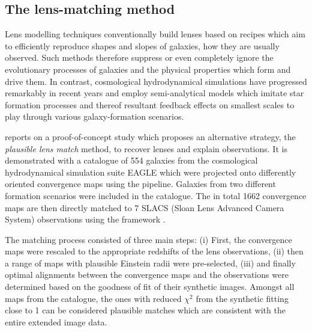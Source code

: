 \subsection{The lens-matching method}

Lens modelling techniques conventionally build lenses based on recipes which aim
to efficiently reproduce shapes and slopes of galaxies, how they are usually
observed.  Such methods therefore suppress or even completely ignore the
evolutionary processes of galaxies and the physical properties which form and
drive them.  In contrast, cosmological hydrodynamical simulations have
progressed remarkably in recent years and employ semi-analytical models which
imitate star formation processes and thereof resultant feedback effects on
smallest scales to play through various galaxy-formation scenarios.

 reports on a proof-of-concept study which proposes an alternative
strategy, the \textit{plausible lens match} method, to recover lenses and
explain observations.  It is demonstrated with a catalogue of 554 galaxies from
the cosmological hydrodynamical simulation suite EAGLE which were projected onto
differently oriented convergence maps using the  pipeline.  
Galaxies from two different formation scenarios were included in the catalogue.
The in total 1662 convergence maps are then directly matched to 7 SLACS (Sloan Lens
Advanced Camera System) observations using the  framework
\cite{gleam}. 

The matching process consisted of three main steps: (i) First, the convergence
maps were rescaled to the appropriate redshifts of the lens observations, (ii)
then a range of maps with plausible Einstein radii were pre-selected, (iii) and
finally optimal alignments between the convergence maps and the observations
were determined based on the goodness of fit of their synthetic images.  Amongst
all maps from the catalogue, the ones with reduced $\chi^{2}$ from the synthetic
fitting close to 1 can be considered plausible matches which are consistent with
the entire extended image data.

